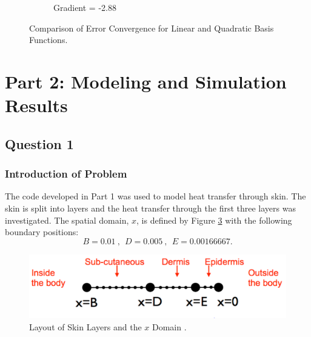 \documentclass[11pt]{article}
\begin{document}
\begin{figure}[ht]
\begin{subfigure}[b]{0.475\textwidth}
            \caption[]%
            {{\small Gradient = -2.88}}    
            \label{fig:q1l2o2}
        \end{subfigure}
        \caption[ Convergence of L2 Norm for Linear and Quadratic Basis Functions.]
        {\small Comparison of Error Convergence for Linear and Quadratic Basis Functions.} 
        \label{fig:q1bl2grad}
\end{figure}
\pagebreak


\section{Part 2: Modeling and Simulation Results}

\subsection{Question 1}

\subsubsection{Introduction of Problem}

The code developed in Part 1 was used to model heat transfer through skin. The skin is split into layers and the heat transfer through the first three layers was investigated. The spatial domain, $x$, is defined by Figure \ref{fig:skinlayers} with the following boundary positions:
\begin{equation*}
 B = 0.01 \ , \ \ D = 0.005 \ , \ \ E  =  0.00166667.
\end{equation*}

\begin{figure}[!h]  %
	\centering
	\includegraphics[width=.75\textwidth]{SkinStructure.png}
    \caption{Layout of Skin Layers and the $x$ Domain \cite{cw2}.}\label{fig:skinlayers}
\end{figure}
\end{document}
